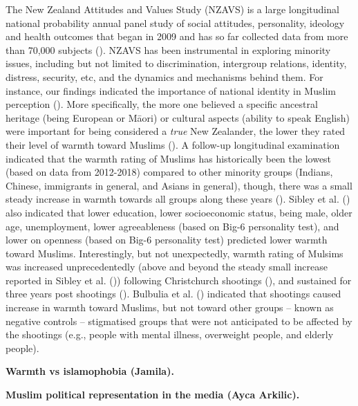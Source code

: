 \documentclass[
  man,
  longtable,
  nolmodern,
  notxfonts,
  notimes,
  colorlinks=true,linkcolor=blue,citecolor=blue,urlcolor=blue]{apa7}
\begin{document}
The New Zealand Attitudes and Values Study (NZAVS) is a large
longitudinal national probability annual panel study of social
attitudes, personality, ideology and health outcomes that began in 2009
and has so far collected data from more than 70,000 subjects
(). NZAVS has been instrumental in exploring minority
issues, including but not limited to discrimination, intergroup
relations, identity, distress, security, etc, and the dynamics and
mechanisms behind them. For instance, our findings indicated the
importance of national identity in Muslim perception
(). More
specifically, the more one believed a specific ancestral heritage (being
European or Māori) or cultural aspects (ability to speak English) were
important for being considered a \emph{true} New Zealander, the lower
they rated their level of warmth toward Muslims
(). A follow-up
longitudinal examination indicated that the warmth rating of Muslims has
historically been the lowest (based on data from 2012-2018) compared to
other minority groups (Indians, Chinese, immigrants in general, and
Asians in general), though, there was a small steady increase in warmth
towards all groups along these years (). Sibley et al. () also
indicated that lower education, lower socioeconomic status, being male,
older age, unemployment, lower agreeableness (based on Big-6 personality
test), and lower on openness (based on Big-6 personality test) predicted
lower warmth toward Muslims. Interestingly, but not unexpectedly, warmth
rating of Mulsims was increased unprecedentedly (above and beyond the
steady small increase reported in Sibley et al.
()) following Christchurch shootings
(), and sustained for
three years post shootings (). Bulbulia et al. () indicated
that shootings caused increase in warmth toward Muslims, but not toward
other groups -- known as negative controls -- stigmatised groups that
were not anticipated to be affected by the shootings (e.g., people with
mental illness, overweight people, and elderly people).

\textbf{Warmth vs islamophobia (Jamila).}

\textbf{Muslim political representation in the media (Ayca Arkilic).}
\end{document}
